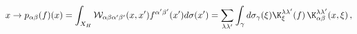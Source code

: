 \begin{equation}
x\rightarrow p_{\alpha\beta}(f)(x)=\int_{X_{H}} {\cal
W}_{\alpha\beta\alpha'\beta'}(x,x')
f^{\alpha'\beta'}(x')d\sigma(x')=\sum_{\lambda\lambda'}\int_{\gamma}d\sigma_{\gamma}(\xi)
{\K}^{\lambda\lambda'}_{\xi}(f)\,{\K}_{\alpha\beta}^{\lambda\lambda'}(x,\xi)\,,
\end{equation}

